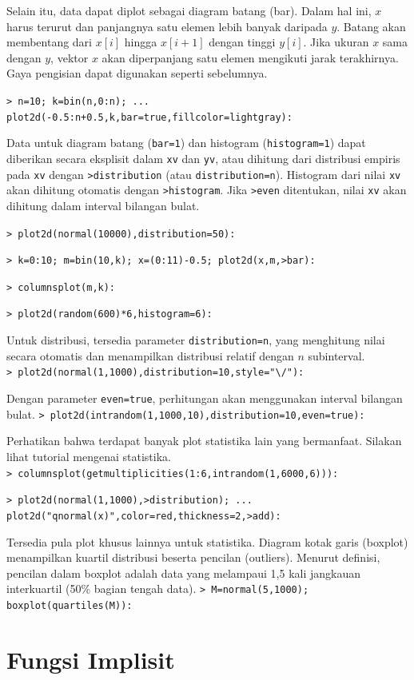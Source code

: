 \documentclass[11pt, a4paper]{article}
\newcommand{\emtcmd}[1]{\noindent\texttt{\textcolor{emtcommand}{>}\ #1}\par\smallskip}
\begin{document}
Selain itu, data dapat diplot sebagai diagram batang (bar). Dalam hal ini, $x$ harus terurut dan panjangnya satu elemen lebih banyak daripada $y$. Batang akan membentang dari $x[i]$ hingga $x[i+1]$ dengan tinggi $y[i]$. Jika ukuran $x$ sama dengan $y$, vektor $x$ akan diperpanjang satu elemen mengikuti jarak terakhirnya. Gaya pengisian dapat digunakan seperti sebelumnya.

\emtcmd{n=10; k=bin(n,0:n); ... \\
\hspace*{1em} plot2d(-0.5:n+0.5,k,bar=true,fillcolor=lightgray):}

Data untuk diagram batang (\texttt{bar=1}) dan histogram (\texttt{histogram=1}) dapat diberikan secara eksplisit dalam \texttt{xv} dan \texttt{yv}, atau dihitung dari distribusi empiris pada \texttt{xv} dengan \texttt{>distribution} (atau \texttt{distribution=n}). Histogram dari nilai \texttt{xv} akan dihitung otomatis dengan \texttt{>histogram}. Jika \texttt{>even} ditentukan, nilai \texttt{xv} akan dihitung dalam interval bilangan bulat.

\emtcmd{plot2d(normal(10000),distribution=50):}
\emtcmd{k=0:10; m=bin(10,k); x=(0:11)-0.5; plot2d(x,m,>bar):}
\emtcmd{columnsplot(m,k):}
\emtcmd{plot2d(random(600)*6,histogram=6):}

Untuk distribusi, tersedia parameter \texttt{distribution=n}, yang menghitung nilai secara otomatis dan menampilkan distribusi relatif dengan $n$ subinterval.
\emtcmd{plot2d(normal(1,1000),distribution=10,style="\textbackslash/"):}

Dengan parameter \texttt{even=true}, perhitungan akan menggunakan interval bilangan bulat.
\emtcmd{plot2d(intrandom(1,1000,10),distribution=10,even=true):}

Perhatikan bahwa terdapat banyak plot statistika lain yang bermanfaat. Silakan lihat tutorial mengenai statistika.
\emtcmd{columnsplot(getmultiplicities(1:6,intrandom(1,6000,6))):}
\emtcmd{plot2d(normal(1,1000),>distribution); ... \\
\hspace*{1em} plot2d("qnormal(x)",color=red,thickness=2,>add):}

Tersedia pula plot khusus lainnya untuk statistika. Diagram kotak garis (boxplot) menampilkan kuartil distribusi beserta pencilan (outliers). Menurut definisi, pencilan dalam boxplot adalah data yang melampaui 1,5 kali jangkauan interkuartil (50\% bagian tengah data).
\emtcmd{M=normal(5,1000); boxplot(quartiles(M)):}

\section*{Fungsi Implisit}
\end{document}
